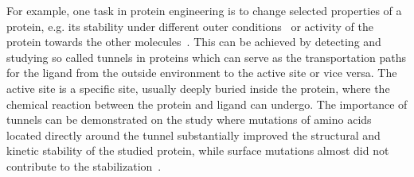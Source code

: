 \documentclass{llncs}
\begin{document}
 For example, one task in protein engineering is to change selected properties of a protein, e.g. its stability under different outer conditions~\cite{Koudelakova2013} or activity of the protein towards the other molecules~\cite{Pavlova2009}.
This can be achieved by detecting and studying so called tunnels in proteins which can serve as the transportation paths for the 
ligand from the outside environment to the active site or vice versa. 
The active site is a specific site, usually deeply buried inside the protein, 
    where the chemical reaction between the protein and ligand can undergo. 
The importance of tunnels can be demonstrated on the study where mutations of amino acids located directly around the tunnel substantially improved the structural and kinetic stability of the studied protein, while
surface mutations almost did not contribute to the stabilization~\cite{Koudelakova2013}.

\end{document}
